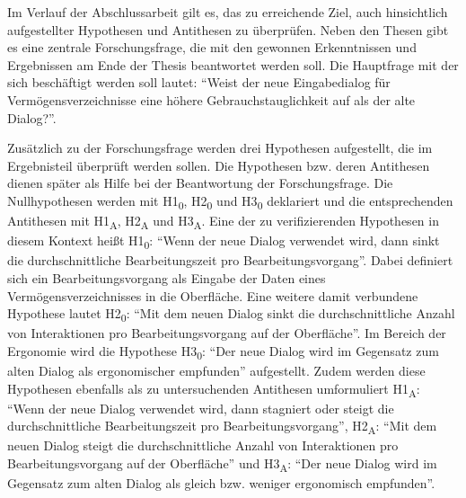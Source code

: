Im Verlauf der Abschlussarbeit gilt es, das zu erreichende Ziel, auch hinsichtlich aufgestellter Hypothesen und Antithesen zu überprüfen. Neben den Thesen gibt es eine zentrale Forschungsfrage, die mit den gewonnen Erkenntnissen und Ergebnissen am Ende der Thesis beantwortet werden soll. Die Hauptfrage mit der sich beschäftigt werden soll lautet: \enquote{Weist der neue Eingabedialog für Vermögensverzeichnisse eine höhere Gebrauchstauglichkeit auf als der alte Dialog?}.

Zusätzlich zu der Forschungsfrage werden drei Hypothesen aufgestellt, die im Ergebnisteil überprüft werden sollen. Die Hypothesen bzw. deren Antithesen dienen später als Hilfe bei der Beantwortung der Forschungsfrage. Die Nullhypothesen werden mit H1\textsubscript{0}, H2\textsubscript{0} und H3\textsubscript{0} deklariert und die entsprechenden Antithesen mit H1\textsubscript{A}, H2\textsubscript{A} und H3\textsubscript{A}. Eine der zu verifizierenden Hypothesen in diesem Kontext heißt H1\textsubscript{0}: \enquote{Wenn der neue Dialog verwendet wird, dann sinkt die durchschnittliche Bearbeitungszeit pro Bearbeitungsvorgang}. Dabei definiert sich ein Bearbeitungsvorgang als Eingabe der Daten eines Vermögensverzeichnisses in die Oberfläche. Eine weitere damit verbundene Hypothese lautet H2\textsubscript{0}: \enquote{Mit dem neuen Dialog sinkt die durchschnittliche Anzahl von Interaktionen pro Bearbeitungsvorgang auf der Oberfläche}. Im Bereich der Ergonomie wird die Hypothese H3\textsubscript{0}: \enquote{Der neue Dialog wird im Gegensatz zum alten Dialog als ergonomischer empfunden} aufgestellt. Zudem werden diese Hypothesen ebenfalls als zu untersuchenden Antithesen umformuliert H1\textsubscript{A}: \enquote{Wenn der neue Dialog verwendet wird, dann stagniert oder steigt die durchschnittliche Bearbeitungszeit pro Bearbeitungsvorgang}, H2\textsubscript{A}: \enquote{Mit dem neuen Dialog steigt die durchschnittliche Anzahl von Interaktionen pro Bearbeitungsvorgang auf der Oberfläche} und H3\textsubscript{A}: \enquote{Der neue Dialog wird im Gegensatz zum alten Dialog als gleich bzw. weniger ergonomisch empfunden}.





